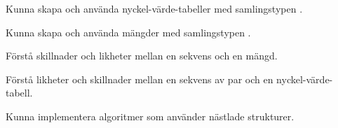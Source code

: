
\item Kunna skapa och använda nyckel-värde-tabeller med samlingstypen .
\item Kunna skapa och använda mängder med samlingstypen .
\item Förstå skillnader och likheter mellan en sekvens och en mängd.
\item Förstå likheter och skillnader mellan en sekvens av par och en nyckel-värde-tabell. 
\item Kunna implementera algoritmer som använder nästlade strukturer. 
